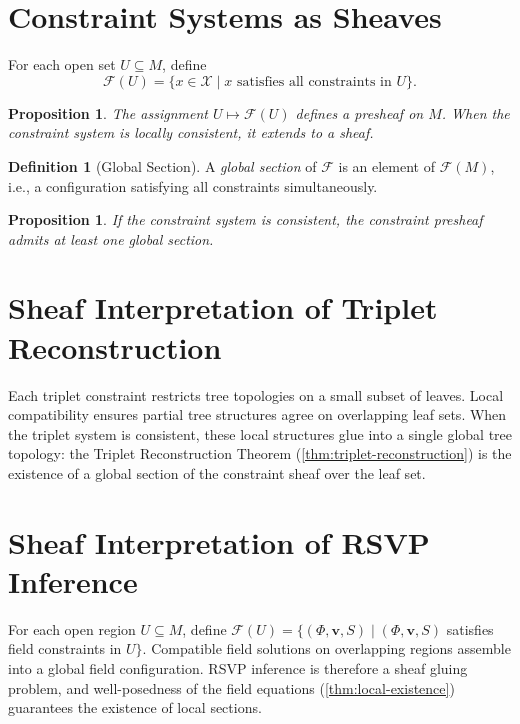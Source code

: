 \documentclass[12pt,a4paper,oneside]{book}
\numberwithin{equation}{chapter}
\theoremstyle{plain}
\newtheorem{proposition}[theorem]{Proposition}
\theoremstyle{definition}
\newtheorem{definition}[theorem]{Definition}
\theoremstyle{remark}
\begin{document}
\section{Constraint Systems as Sheaves}

For each open set $U \subseteq M$, define
\[
\mathcal{F}(U) = \{ x \in \mathcal{X} \mid x \text{ satisfies
all constraints in } U \}.
\]

\begin{proposition}
The assignment $U \mapsto \mathcal{F}(U)$ defines a presheaf on $M$.
When the constraint system is locally consistent, it extends to a
sheaf.
\end{proposition}

\begin{definition}[Global Section]
A \emph{global section} of $\mathcal{F}$ is an element of
$\mathcal{F}(M)$, i.e., a configuration satisfying all constraints
simultaneously.
\end{definition}

\begin{proposition}
If the constraint system is consistent, the constraint presheaf
admits at least one global section.
\end{proposition}

\section{Sheaf Interpretation of Triplet Reconstruction}

Each triplet constraint restricts tree topologies on a small subset
of leaves. Local compatibility ensures partial tree structures agree
on overlapping leaf sets. When the triplet system is consistent,
these local structures glue into a single global tree topology: the
Triplet Reconstruction Theorem (\cref{thm:triplet-reconstruction})
is the existence of a global section of the constraint sheaf over the
leaf set.

\section{Sheaf Interpretation of RSVP Inference}

For each open region $U \subseteq M$, define
$\mathcal{F}(U) = \{(\Phi,\mathbf{v},S) \mid (\Phi,\mathbf{v},S)$
satisfies field constraints in $U\}$.
Compatible field solutions on overlapping regions assemble into a
global field configuration. RSVP inference is therefore a sheaf
gluing problem, and well-posedness of the field equations
(\cref{thm:local-existence}) guarantees the existence of local
sections.
\end{document}
